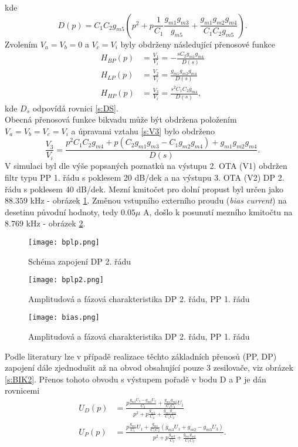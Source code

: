 kde
\begin{equation}
D(p) = C_1C_2g_{m5}(p^2 + p\frac{1}{C_1}\frac{g_{m1}g_{m3}}{g_{m5}} + \frac{g_{m1}g_{m2}g_{m4}}{C_1C_2g_{m5}}).
\end{equation}\label{s:DS}
\noindent Zvolením $V_a = V_b = 0$ a $V_c = V_i$ byly obdrženy následující přenosové funkce
\begin{align}
H_{BP}(p) &= \frac{V_1}{V_i} = - \frac{sC_2g_{m1}g_{m4}}{D(s)}\\
H_{LP}(p) &= \frac{V_2}{V_i} = \frac{g_{m1}g_{m2}g_{m4}}{D(s)}\\
H_{HP}(p) &= \frac{V_3}{V_i} = \frac{s^2C_1C_2g_{m4}}{D(s)},
\end{align}
kde $D_s$ odpovídá rovnici \ref{s:DS}.\\
Obecná přenosová funkce bikvadu může být obdržena položením $V_a = V_b = V_c = V_i$ a úpravami vztahu \ref{s:V3} bylo obdrženo
\begin{equation}
\frac{V_3}{V_i} = \frac{p^2C_1C_2g_{m4} + p(C_2g_{m1}g_{m3} - C_1g_{m2}g_{m4}) + g_{m1}g_{m2}g_{m4}}{D(s)}.
\end{equation}
\noindent 
V simulaci byl dle výše popsaných poznatků na výstupu 2. OTA (V1) obdržen filtr typu PP 1. řádu s poklesem 20 dB/dek a na výstupu 3. OTA (V2) DP 2. řádu s poklesem 40 dB/dek. Mezní kmitočet pro dolní propust byl určen jako $88.359$ kHz - obrázek \ref{PET}. Změnou vstupního externího proudu (\textit{bias current}) na desetinu původní hodnoty, tedy $0.05 \mu$ A, došlo k posunutí mezního kmitočtu na $8.769$ kHz - obrázek \ref{PET1}.
\begin{figure}[h]
\centering
\texttt{[image: bplp.png]}
\caption{Schéma zapojení DP 2. řádu}
\end{figure}
\begin{figure}[h]
\centering
\texttt{[image: bplp2.png]}
\caption{Amplitudová a fázová charakteristika DP 2. řádu, PP 1. řádu\label{PET}}
\end{figure}
\begin{figure}[h]
\centering
\texttt{[image: bias.png]}
\caption{Amplitudová a fázová charakteristika DP 2. řádu, PP 1. řádu\label{PET1}}
\end{figure}
\noindent Podle literatury \cite{7} lze v případě realizace těchto základních přenosů (PP, DP) zapojení dále zjednodušit až na obvod obsahující pouze 3 zesilovače, viz obrázek \ref{s:BIK2}. Přenos tohoto obvodu s výstupem pořadě v bodu D a P je dán rovnicemi
\begin{align}
U_D(p) &= \frac{p\frac{g_{m3}U_3-g_{m2}U_2}{C_2}+\frac{g_{m1}g_{m2}}{C_1C_2}U_1}{p^2 + p\frac{g_{m3}}{C_2} + \frac{g_{m1}g_{m2}}{C_1C_2}}\\
U_P(p) &= \frac{p\frac{g_{m1}}{C_1}U_1 + \frac{g_{m1}}{C_1C_2}(g_{m3}U_1+g_{m2}-g_{m3}U_3)}{p^2 + p\frac{g_{m3}}{C_2} + \frac{g_{m1}g_{m2}}{C_1C_2}}.
\end{align}
